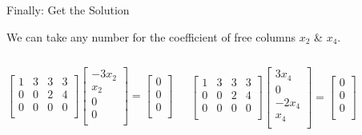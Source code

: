 \documentclass{beamer}
\begin{document}
\begin{frame}{Finally: Get the Solution}
\vspace{3pt}


We can take any number for the coefficient of free columns $x_2$ \& $x_4$.
\vspace{-5pt}
\begin{columns}
    \begin{equation*}
        \left[ \begin{matrix}
            1&		3&		3&		3\\
            0&		0&		2&		4\\
            0&		0&		0&		0\\
        \end{matrix} \right] \left[ \begin{array}{c}
            -3x_2\\
            x_2\\
            0\\
            0\\
        \end{array} \right] =\left[ \begin{array}{c}
            0\\
            0\\
            0\\
        \end{array} \right]
    \end{equation*}

    \begin{equation*}
        \left[ \begin{matrix}
            1&		3&		3&		3\\
            0&		0&		2&		4\\
            0&		0&		0&		0\\
        \end{matrix} \right] \left[ \begin{array}{c}
            3x_4\\
            0\\
            -2x_4\\
            x_4\\
        \end{array} \right] =\left[ \begin{array}{c}
            0\\
            0\\
            0\\
        \end{array} \right]
    \end{equation*}
\end{columns}


\end{frame}
\end{document}
